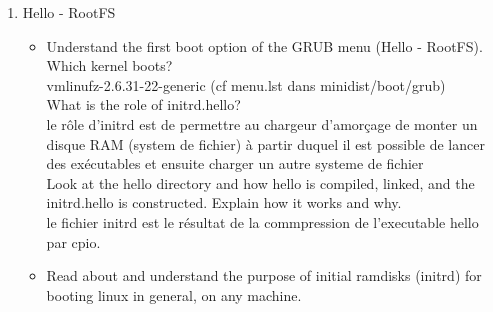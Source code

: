 \documentclass[10]{article}
\begin{document}
\begin{enumerate}
\begin{itemize}
\item Read about and understand the GRUB process and how it is installed on a disk and the GRUB boot stages.

Sur le disque il faut sur le MBR le stage 1 ()
ensuite on  place le Stage 1.5 pour que certains driver sp\'ecifique soit charg\'es si n\'ecessaire.  ( dans les 30 kilooctets suivant le MBR).
Stage 1 charge Stage 1.5 si il est pr\'esent sinon il charge Stage 2.La partie 1.5 peut contenir des pilotes pour pouvoir acc\'eder à la partie 2.
Stage 1.5 charge  Stage 2 qui est plac\'e sur . 


\item Read about and understand the GRUB menu given to you.\\




\end{itemize}

\item Hello - RootFS
\begin{itemize}
\item Understand the first boot option of the GRUB menu (Hello - RootFS).
Which kernel boots? \\
vmlinufz-2.6.31-22-generic (cf menu.lst dans minidist/boot/grub)\\
What is the role of initrd.hello? \\
le r\^ole d'initrd est de permettre au chargeur d'amor\c cage de monter un disque RAM (system de fichier) \`a partir duquel il est possible de lancer des ex\'ecutables et ensuite charger un autre systeme de fichier\\

Look at the hello directory and how hello is compiled, linked, and the initrd.hello is constructed. 
Explain how it works and why.\\

le fichier initrd est le résultat de la commpression de l'executable hello par cpio.\\


\item Read about and understand the purpose of initial ramdisks (initrd)
for booting linux in general, on any machine.
\end{itemize}


\end{enumerate}
\end{document}
